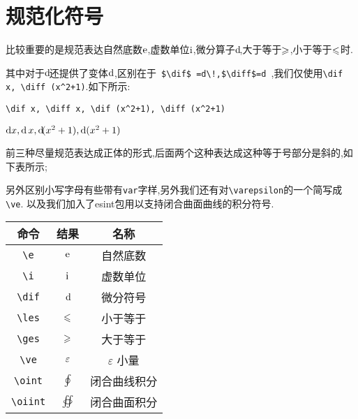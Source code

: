 \documentclass[lang=cn,12pt,scheme=chinese,mode=simple,black]{elegantbook}
\begin{document}
\section{规范化符号}

比较重要的是规范表达自然底数$\mathrm{e}$,虚数单位$\mathrm{i}$,微分算子$\operatorname{d\!}$,大于等于$\geqslant$,小于等于$\leqslant$时.

其中对于$\operatorname{d\!}$还提供了变体$\operatorname{d}$,区别在于\verb| $\dif$ =d\!,$\diff$=d |,我们仅使用\verb|\dif x, \diff (x^2+1)|.如下所示:
\begin{lstlisting}
\dif x, \diff x, \dif (x^2+1), \diff (x^2+1)
\end{lstlisting}

\begin{resultbox}
    $\operatorname{d\!} x, \operatorname{d} x, \operatorname{d\!} (x^2+1), \operatorname{d} (x^2+1)$
\end{resultbox}

前三种尽量规范表达成正体的形式,后面两个这种表达成这种等于号部分是斜的,如下表所示;

另外区别小写字母有些带有\verb|var|字样,另外我们还有对\verb|\varepsilon|的一个简写成\verb|\ve|.
以及我们加入了esint包用以支持闭合曲面曲线的积分符号.

\begin{center}
    \setlength{\tabcolsep}{10pt}
    \begin{tabular}{|c|c|c|}
        \hline
        \textbf{命令} & \textbf{结果} & \textbf{名称}      \\
        \hline
        \verb|\e|     & $\mathrm{e}$          & 自然底数           \\
        \verb|\i|     & $\mathrm{i}$          & 虚数单位           \\
        \verb|\dif|   & $\operatorname{d\!}$        & 微分符号           \\
        \verb|\les|   & $\leqslant$        & 小于等于           \\
        \verb|\ges|   & $\geqslant$        & 大于等于           \\
        \verb|\ve|    & $\varepsilon$         & $\varepsilon$ 小量 \\
        \verb|\oint|  & $\oint$       & 闭合曲线积分       \\
        \verb|\oiint| & $\oiint$      & 闭合曲面积分       \\
        \hline
    \end{tabular}
\end{center}
\end{document}
